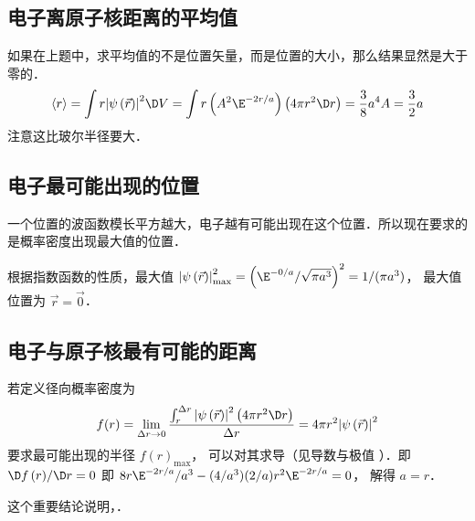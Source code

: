 \subsection{电子离原子核距离的平均值}

如果在上题中，求平均值的不是位置矢量，而是位置的大小，那么结果显然是大于零的．
\begin{equation}
 \left\langle r \right\rangle = \int {r{{\left| {\psi \left( {\vec r} \right)} \right|}^2} \D V} = \int {r \left(A^2 \E^{-2r/a}\right)\left( {4\pi {r^2} \D r} \right)}= \frac{3}{8}{a^4}A = \frac{3}{2}a
\end{equation}
注意这比玻尔半径要大．

\subsection{电子最可能出现的位置}

 一个位置的波函数模长平方越大，电子越有可能出现在这个位置．所以现在要求的是概率密度出现最大值的位置．
 
 根据指数函数的性质，最大值 $\left| {\psi \left( {\vec r} \right)} \right|_{\max }^2 ={\left( {\E^{-0/a}}/{{\sqrt {\pi {a^3}} }} \right)^2} = {1}/({{\pi {a^3}}})$， 最大值位置为 $\vec r = \vec 0$． 

\subsection{电子与原子核最有可能的距离}
若定义径向概率密度为
\begin{equation}
f(r) = \lim_{\Delta r \to 0} \frac{\int_r^{\Delta r} {{{\left| {\psi \left( {\vec r} \right)} \right|}^2}\left( {4\pi {r^2} \D r} \right)} }{\Delta r} = 4\pi {r^2}{\left| {\psi \left( {\vec r} \right)} \right|^2}
  \end{equation}
  要求最可能出现的半径 $f{\left( r \right)_{\max }}$，  可以对其求导（见导数与极值%
  ）．即 ${{ \D f\left( r \right)}}/{{ \D r}} = 0$ 即 ${8 r{\E^{-2r/a}}}/{{{a^3}}} - ({4}/{{{a^3}}})({2}/{a}){r^2}{\E^{-2r/a}} = 0$， 解得 $a = r$． 
 
这个重要结论说明，．
